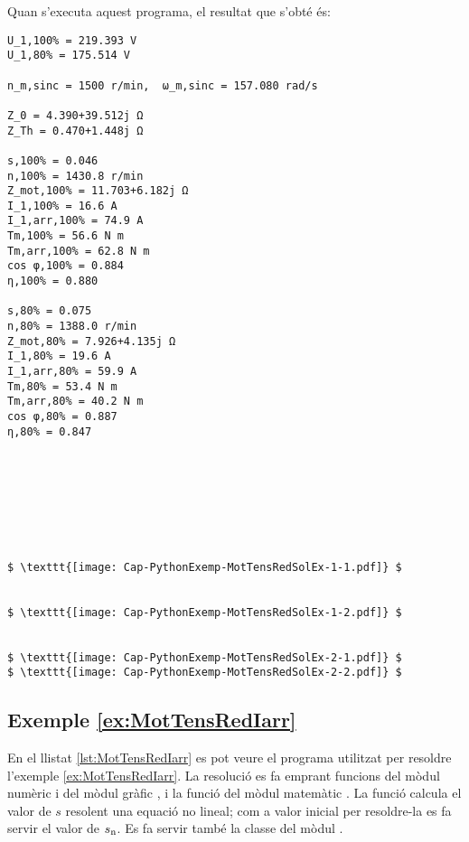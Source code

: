 Quan s'executa aquest programa, el resultat que s'obté és:
\lstset{
	language=,
	numbers=none,
	frame=none
}
\begin{lstlisting}[mathescape=true]
U_1,100% = 219.393 V
U_1,80% = 175.514 V

n_m,sinc = 1500 r/min,  ω_m,sinc = 157.080 rad/s

Z_0 = 4.390+39.512j Ω
Z_Th = 0.470+1.448j Ω

s,100% = 0.046
n,100% = 1430.8 r/min
Z_mot,100% = 11.703+6.182j Ω
I_1,100% = 16.6 A
I_1,arr,100% = 74.9 A
Tm,100% = 56.6 N m
Tm,arr,100% = 62.8 N m
cos φ,100% = 0.884
η,100% = 0.880

s,80% = 0.075
n,80% = 1388.0 r/min
Z_mot,80% = 7.926+4.135j Ω
I_1,80% = 19.6 A
I_1,arr,80% = 59.9 A
Tm,80% = 53.4 N m
Tm,arr,80% = 40.2 N m
cos φ,80% = 0.887
η,80% = 0.847








$ \texttt{[image: Cap-PythonExemp-MotTensRedSolEx-1-1.pdf]} $


$ \texttt{[image: Cap-PythonExemp-MotTensRedSolEx-1-2.pdf]} $


$ \texttt{[image: Cap-PythonExemp-MotTensRedSolEx-2-1.pdf]} $
$ \texttt{[image: Cap-PythonExemp-MotTensRedSolEx-2-2.pdf]} $
\end{lstlisting} 



\hypertarget{exemple:MotTensRedIarr}{\subsection{Exemple \ref*{ex:MotTensRedIarr} \MotTensRedIarr}}
En el llistat \vref{lst:MotTensRedIarr} es pot veure el programa utilitzat per resoldre l'exemple \vref{ex:MotTensRedIarr}. La resolució es fa emprant funcions del mòdul numèric  i del mòdul gràfic , i la funció  del mòdul matemàtic . La funció  calcula el valor de $s$ resolent una equació no lineal; com a valor inicial per resoldre-la  es fa servir el valor de $s_\mathrm{n}$. Es fa servir també la classe  del mòdul .


